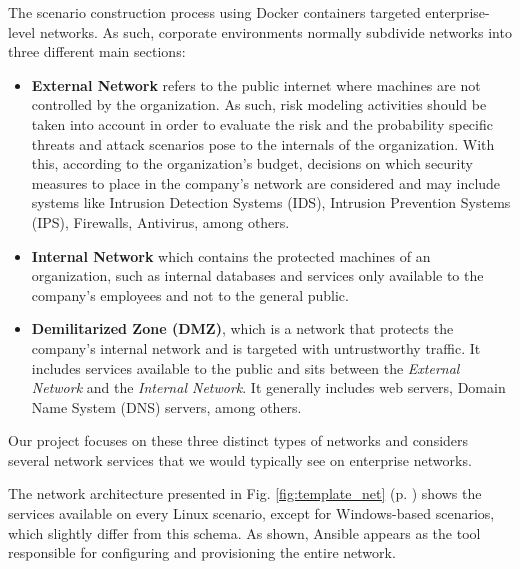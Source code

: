 The scenario construction process using Docker containers targeted enterprise-level networks. As such, corporate environments normally subdivide networks into three different main sections:

\begin{itemize}
    \item \textbf{External Network} refers to the public internet where machines are not controlled by the organization. As such, risk modeling activities should be taken into account in order to evaluate the risk and the probability specific threats and attack scenarios pose to the internals of the organization. With this, according to the organization's budget, decisions on which security measures to place in the company's network are considered and may include systems like Intrusion Detection Systems (IDS), Intrusion Prevention Systems (IPS), Firewalls, Antivirus, among others.
    \item \textbf{Internal Network} which contains the protected machines of an organization, such as internal databases and services only available to the company's employees and not to the general public.
    \item \textbf{Demilitarized Zone (DMZ)}, which is a network that protects the company's internal network and is targeted with untrustworthy traffic. It includes services available to the public and sits between the \textit{External Network} and the \textit{Internal Network}. It generally includes web servers, Domain Name System (DNS) servers, among others.
\end{itemize}

Our project focuses on these three distinct types of networks and considers several network services that we would typically see on enterprise networks.

The network architecture presented in Fig. \ref{fig:template_net} (p. \pageref{fig:template_net}) shows the services available on every Linux scenario, except for Windows-based scenarios, which slightly differ from this schema. As shown, Ansible appears as the tool responsible for configuring and provisioning the entire network.


